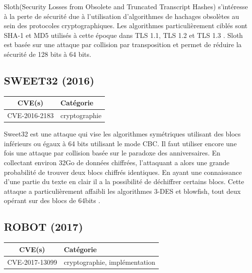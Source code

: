 \vspace{1em}

Sloth(Security Losses from Obsolete and Truncated Transcript Hashes) s'intéresse à la perte de sécurité due à l'utilisation d'algorithmes de hachages obsolètes au sein des protocoles cryptographiques. Les algorithmes particulièrement ciblés sont SHA-1 et MD5 utilisés à cette époque dans TLS 1.1, TLS 1.2 et TLS 1.3 . Sloth est basée sur une attaque par collision par transposition et permet de réduire la sécurité de 128 bits à 64 bits\cite{sloth}.




\subsection{SWEET32 (2016)}

\begin{tabularx}{0.96\textwidth}{|c|X|}
  \hline
  \textbf{CVE(s)} & \textbf{Catégorie} \\
  \hline
  CVE-2016-2183 & cryptographie \\
  \hline
\end{tabularx}

\vspace{1em}

Sweet32 est une attaque qui vise les algorithmes symétriques utilisant des blocs inférieurs ou égaux à 64 bits utilisant le mode CBC. Il faut utiliser encore une fois une attaque par collision basée sur le paradoxe des anniversaires. En collectant environ 32Go de données chiffrées, l'attaquant a alors une grande probabilité de trouver deux blocs chiffrés identiques. En ayant une connaissance d'une partie du texte en clair il a la possibilité de déchiffrer certains blocs. Cette attaque a particulièrement affaibli les algorithmes 3-DES et blowfish, tout deux opérant sur des blocs de 64bits \cite{sweet32}.




\subsection{ROBOT (2017)}

\begin{tabularx}{0.96\textwidth}{|c|X|}
  \hline
  \textbf{CVE(s)} & \textbf{Catégorie} \\
  \hline
  CVE-2017-13099 & cryptographie, implémentation \\
  \hline
\end{tabularx}

